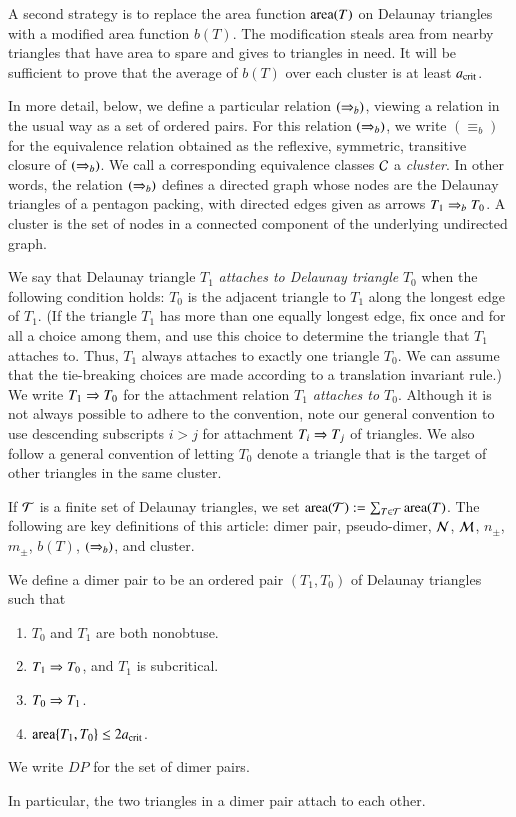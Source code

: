 A second strategy is to replace the area function ${\operatorname{area}}(T)$ on
Delaunay triangles with a modified area function $b(T)$.  The
modification steals area from nearby triangles that have area to spare
and gives to triangles in need.  It will be sufficient to prove that
the average of $b(T)$ over each cluster is at least $a_\text{crit}$.

In more detail, below, we define a particular relation $(\Rightarrow_{b})$,
viewing a relation in the usual way as a set of ordered pairs.  For
this relation $(\Rightarrow_{b})$, we write ${(\equiv_{b})}$ for the equivalence
relation obtained as the reflexive, symmetric, transitive closure of
$(\Rightarrow_{b})$.  We call a corresponding equivalence classes $\mathcal C$ a {\it
  cluster}.  In other words, the relation $(\Rightarrow_{b})$ defines a directed
graph whose nodes are the Delaunay triangles of a pentagon packing,
with directed edges given as arrows $T_1\Rightarrow_{b} T_0$.  A cluster is the
set of nodes in a connected component of the underlying undirected
graph.

We say that Delaunay triangle $T_1$ {\it attaches to Delaunay
  triangle} $T_0$ when the following condition holds: $T_0$ is the
adjacent triangle to $T_1$ along the longest edge of $T_1$.  (If the
triangle $T_1$ has more than one equally longest edge, fix once and
for all a choice among them, and use this choice to determine the
triangle that $T_1$ attaches to.  Thus, $T_1$ always attaches to
exactly one triangle $T_0$.  We can assume that the tie-breaking
choices are made according to a translation invariant rule.)  We write
$T_1 \Rightarrow T_0$ for the attachment relation {\it $T_1$ attaches to
  $T_0$}.  Although it is not always possible to adhere to the
convention, note our general convention to use descending subscripts
$i > j$ for attachment $T_i\Rightarrow T_j$ of triangles.  We also follow a
general convention of letting $T_0$ denote a triangle that is the
target of other triangles in the same cluster.

If $\mathcal T$ is a finite set of Delaunay triangles, we set
${\operatorname{area}}(\mathcal T):=\sum_{T\in\mathcal T} {\operatorname{area}}(T)$.  The following are key
definitions of this article: dimer pair, pseudo-dimer, $\mathcal N$, $\mathcal M$,
$n_\pm$, $m_\pm$, $b(T)$, $(\Rightarrow_{b})$, and cluster.

\begin{definition}
  We define a dimer pair to be an ordered pair $(T_1,T_0)$ of Delaunay
  triangles such that
\begin{enumerate}
\item $T_0$ and $T_1$ are both nonobtuse.
\item $T_1\Rightarrow T_0$, and $T_1$ is subcritical.
\item $T_0 \Rightarrow T_1$.
\item ${\operatorname{area}}\{T_1,T_0\} \le 2a_\text{crit}$.
\end{enumerate}
We write $DP$ for the set of dimer pairs.
\end{definition}
In particular, the two triangles in a dimer pair attach to each other.

